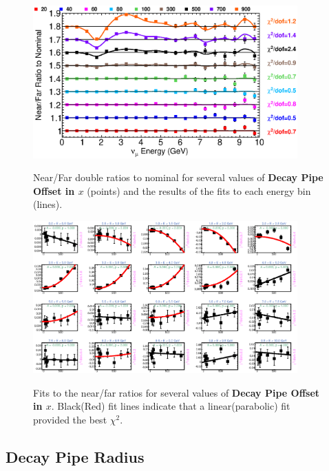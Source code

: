 \begin{figure}[ht]
  \begin{center}
    {\includegraphics[width=4.0in]{figures/DecayPipeOffsetX_nof_summary.eps}}
  \end{center}
\caption{ Near/Far double ratios to nominal for several values of {\bf Decay Pipe Offset in $x$} (points) and the results of the fits to each energy bin (lines).}
\end{figure}

\begin{figure}[hb]
  \begin{center}
    {\includegraphics[width=4.0in]{figures/DecayPipeOffsetX_nof_fits.eps}}
  \end{center}
\caption{ Fits to the near/far ratios for several values of {\bf Decay Pipe Offset in $x$}. Black(Red) fit lines indicate that a linear(parabolic) fit provided the best $\chi^2$. }
\end{figure}

\clearpage
\subsection{Decay Pipe Radius}

